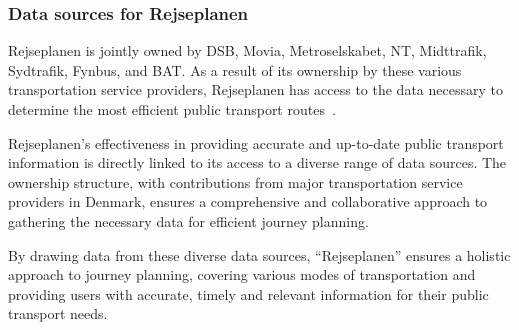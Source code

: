 \subsubsection{Data sources for Rejseplanen}
Rejseplanen is jointly owned by DSB, Movia, Metroselskabet, NT, Midttrafik, Sydtrafik, Fynbus, and BAT\@.
As a result of its ownership by these various transportation service providers, Rejseplanen has access to the data
necessary to determine the most efficient public transport routes~\cite{rejseplanen2023}.

Rejseplanen's effectiveness in providing accurate and up-to-date public transport information is directly linked to its
access to a diverse range of data sources.
The ownership structure, with contributions from major transportation service providers in Denmark, ensures a
comprehensive and collaborative approach to gathering the necessary data for efficient journey planning.

By drawing data from these diverse data sources, ``Rejseplanen'' ensures a holistic approach to journey planning,
covering various modes of transportation and providing users with accurate, timely and relevant information for their
public transport needs.

